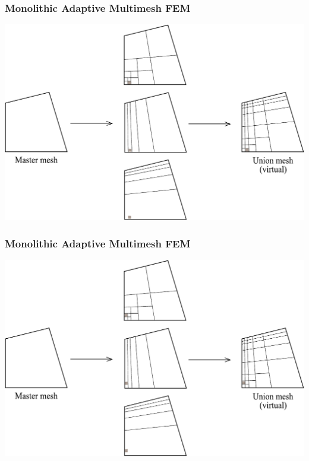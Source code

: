 \begin{frame}
  \frametitle{Monolithic Adaptive Multimesh FEM}
  \begin{center}
    \includegraphics[height=0.7\textheight]{multimesh/mm_2.pdf}
  \end{center}
\end{frame}

\begin{frame}
  \frametitle{Monolithic Adaptive Multimesh FEM}
  \begin{center}
    \includegraphics[height=0.7\textheight]{multimesh/mm_3.pdf}
  \end{center}
\end{frame}

